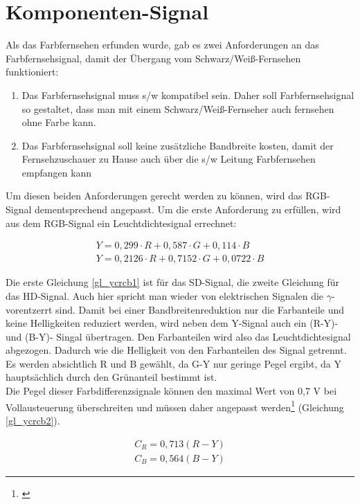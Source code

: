 \section{Komponenten-Signal}
\label{sec_ycrcb}
Als das Farbfernsehen erfunden wurde, gab es zwei Anforderungen an das Farbfernsehsignal, damit der Übergang vom Schwarz/Weiß-Fernsehen funktioniert: 
\begin{enumerate}
\item Das Farbfernsehsignal muss s/w kompatibel sein. Daher soll Farbfernsehsignal so gestaltet, dass man mit einem Schwarz/Weiß-Fernseher auch fernsehen ohne Farbe kann.
\item Das Farbfernsehsignal soll keine zusätzliche Bandbreite kosten, damit der Fernsehzuschauer zu Hause auch über die s/w Leitung Farbfernsehen empfangen kann
\end{enumerate}

Um diesen beiden Anforderungen gerecht werden zu können, wird das RGB-Signal dementsprechend angepasst. Um die erste Anforderung zu erfüllen, wird aus dem RGB-Signal ein Leuchtdichtesignal errechnet:

\begin{eqnarray}\label{gl_ycrcb1}
	Y = 0,299 \cdot R + 0,587 \cdot G + 0,114 \cdot B\\
	Y = 0,2126 \cdot R + 0,7152 \cdot G + 0,0722 \cdot B
\end{eqnarray}

Die erste Gleichung \ref{gl_ycrcb1} ist für das SD-Signal, die zweite Gleichung für das HD-Signal. Auch hier spricht man wieder von elektrischen Signalen die $\gamma$-vorentzerrt sind. Damit bei einer Bandbreitenreduktion nur die Farbanteile und keine Helligkeiten reduziert werden, wird neben dem Y-Signal auch ein (R-Y)- und (B-Y)- Singal übertragen. Den Farbanteilen wird also das Leuchtdichtesignal abgezogen. Dadurch wie die Helligkeit von den Farbanteilen des Signal getrennt. Es werden absichtlich R und B gewählt, da G-Y nur geringe Pegel ergibt, da Y hauptsächlich durch den Grünanteil bestimmt ist.\\ Die Pegel dieser Farbdifferenzsignale können den maximal Wert von 0,7 V bei Vollausteuerung überschreiten und müssen daher angepasst werden\footnote{\cite[84]{schmidt}} (Gleichung \ref{gl_ycrcb2}).

\begin{eqnarray}\label{gl_ycrcb2}
	C_{R}=0,713(R-Y)\\
	C_{B}=0,564(B-Y)
\end{eqnarray}

